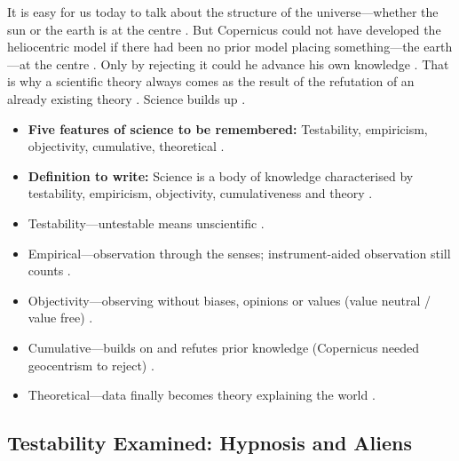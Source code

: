 \begin{ExampleBox}
It is easy for us today to talk about the structure of the universe---whether the sun or the earth is at the centre . But Copernicus could not have developed the heliocentric model if there had been no prior model placing something---the earth---at the centre . Only by rejecting it could he advance his own knowledge . That is why a scientific theory always comes as the result of the refutation of an already existing theory . Science builds up .
\end{ExampleBox}

\begin{KeyConcept}
\begin{itemize}
    \item \textbf{Five features of science to be remembered:} Testability, empiricism, objectivity, cumulative, theoretical .
    \item \textbf{Definition to write:} Science is a body of knowledge characterised by testability, empiricism, objectivity, cumulativeness and theory .
\end{itemize}
\end{KeyConcept}

\begin{QuickRevision}
\begin{itemize}
    \item Testability---untestable means unscientific .
    \item Empirical---observation through the senses; instrument-aided observation still counts .
    \item Objectivity---observing without biases, opinions or values (value neutral / value free) .
    \item Cumulative---builds on and refutes prior knowledge (Copernicus needed geocentrism to reject) .
    \item Theoretical---data finally becomes theory explaining the world .
\end{itemize}
\end{QuickRevision}

\subsection{Testability Examined: Hypnosis and Aliens}

